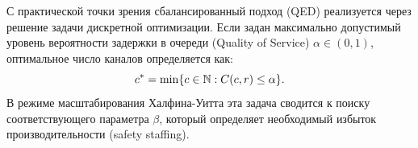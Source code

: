 \begin{note}
С практической точки зрения сбалансированный подход (QED) реализуется через решение задачи дискретной оптимизации. Если задан максимально допустимый уровень вероятности задержки в очереди (Quality of Service) $\alpha \in (0, 1)$, оптимальное число каналов определяется как:
$$
c^* = \min \{ c \in \mathbb{N} : C(c, r) \le \alpha \}.
$$
В режиме масштабирования Халфина-Уитта эта задача сводится к поиску соответствующего параметра $\beta$, который определяет необходимый избыток производительности (safety staffing).
\end{note}